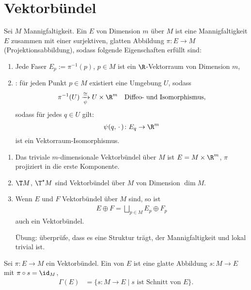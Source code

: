 \section{Vektorbündel}
\begin{definition}
	Sei $M$ Mannigfaltigkeit. Ein  $E$ von Dimension $m$ über $M$ ist eine Mannigfaltigkeit $E$ zusammen mit einer surjektiven, glatten Abbildung $\pi\colon E\to M$ (Projektionsabbildung), sodass folgende Eigenschaften erfüllt sind:\begin{enumerate}[label={(\arabic*)}]
		\item Jede Faser $E_p := \pi^{-1}(p)$, $p\in M$ ist ein $\R$-Vektorraum von Dimension $m$,
		\item {}: für jeden Punkt $p\in M$ existiert eine Umgebung $U$, sodass \begin{align*}
			\pi^{-1}(U)\xrightarrow[\psi]\cong U\times \R^m\quad\text{Diffeo- und Isomorphismus},
		\end{align*}
		sodass für jedes $q\in U$ gilt: \begin{align*}
			\psi(q,\,\cdot\,)\colon E_q\to \R^m
		\end{align*}
		ist ein Vektorraum-Isomorphismus.
	\end{enumerate}
\end{definition}

\begin{example}
	\begin{enumerate}[label={(\arabic*)}]
		\item Das triviale $m$-dimensionale Vektorbündel über $M$ ist $E=M\times\R^m$, $\pi$ projiziert in die erste Komponente.
		\item $\T M$, $\T^\star M$ sind Vektorbündel über $M$ von Dimension $\dim M$.
		\item Wenn $E$ und $F$ Vektorbündel über $M$ sind, so ist \begin{align*}
			E\oplus F = \bigsqcup_{p\in M} E_p\oplus F_p
		\end{align*}
		auch ein Vektorbündel.
		
		Übung: überprüfe, dass es eine Struktur trägt, der Mannigfaltigkeit und lokal trivial ist.
	\end{enumerate}
\end{example}

\begin{definition}
	Sei $\pi\colon E\to M$ ein Vektorbündel. Ein  von $E$ ist eine glatte Abbildung $s\colon M\to E$ mit $\pi\circ s = \id_M$, \begin{align*}
		\Gamma(E) &= \{s\colon M\to E\mid \text{$s$ ist Schnitt von $E$}\}.
	\end{align*}
\end{definition}


